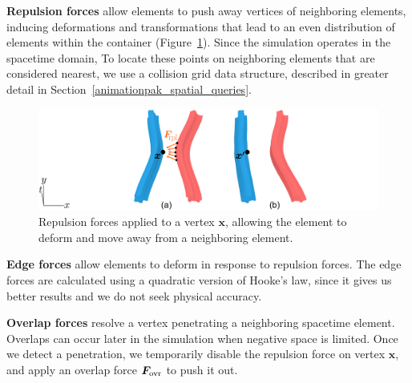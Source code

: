 \newtext
{
\textbf{Repulsion forces} allow elements to push away vertices of 
neighboring elements, inducing deformations and transformations that lead 
to an even distribution of elements within the container
(Figure~\ref{fig_animationpak_repulsion_force}).
Since the simulation operates in the spacetime domain,
To locate these points on neighboring elements that are considered 
nearest, we use a collision grid data structure, described in greater
detail in Section~\ref{animationpak_spatial_queries}.
}


\begin{figure} 
\centering
\includegraphics[width=1.0\textwidth]{figures/animationpak/repulsion_force.pdf} 
\caption[An illustration of the repulsion forces]
{\label{fig_animationpak_repulsion_force} 
Repulsion forces applied to a vertex $\bm{x}$, 
allowing the element to deform and move away from a neighboring element.}
\end{figure}



\newtext
{
\textbf{Edge forces}
allow elements to deform in response to repulsion forces.
}
\nnewtext
{The edge forces are calculated using a quadratic version of Hooke's law, 
since it gives us better results and we do not seek physical accuracy.}

\newtext
{
\textbf{Overlap forces} resolve a vertex penetrating a
neighboring spacetime element.
Overlaps can occur later in the simulation when negative space is 
limited.  Once we detect a penetration,  
we temporarily disable the repulsion force on vertex $\bm{x}$, and apply
an overlap force $\bm{F}_\mathrm{ovr}$ to push it out.
}

